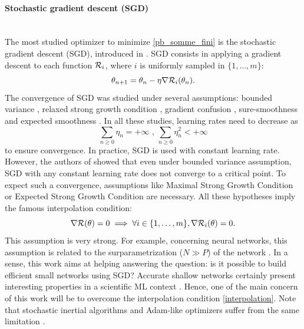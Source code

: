 \paragraph{Stochastic gradient descent (SGD)}
~~\\
The most studied optimizer to minimize \eqref{pb_somme_fini} is the stochastic gradient descent (SGD), introduced in \cite{SGD_Robins}. SGD consists in applying a gradient descent to each function $\mathcal{R}_i$, where $i$ is uniformly sampled in $\{1,\dots,m\}$:
\begin{equation}
	\theta_{n+1} = \theta_n-\eta \nabla \mathcal{R}_i(\theta_n).
	\label{SGD}
\end{equation}
The convergence of SGD was studied under several assumptions:
bounded variance \cite{sgd_general_diminishing_lr,Bertsekas_basis,sgd_dynamical_basis,bertsekas_theorem,SGD_upper_bound}, relaxed strong growth condition \cite{RG_mean,RG_almost_sure}, gradient confusion \cite{gradient_confusion}, sure-smoothness \cite{sure_smoothness_sgd} and expected smoothness \cite{ES_sgd,sgd_descent_condition,ES_sgd,sgd_global_KL}. In all these studies, learning rates need to decrease as
\begin{equation}
	\sum_{n\geq 0} \eta_n = +\infty \text{ , } \sum_{n\geq 0} \eta_n^{2}<+\infty
	\label{diminishing_step}
\end{equation}
to ensure convergence. In practice, SGD is used with constant learning rate. However, the authors of \cite{sgd_prec} showed that even under bounded variance assumption, SGD with any constant learning rate does not converge to a critical point. To expect such a convergence, assumptions like Maximal Strong Growth Condition \cite{MSG_strong_convex,MSG_IG} or Expected Strong Growth Condition \cite{ESG_upper_bound} are necessary. All these hypotheses imply the famous interpolation condition:
\begin{equation}
  \nabla \mathcal{R}(\theta)=0 \implies \forall i\in\{1,\dots,m\}, \nabla \mathcal{R}_i(\theta)=0.
	\label{interpolation}
\end{equation}
This assumption is very strong. For example, concerning neural networks, this assumption is related to the surparametrization ($N\gg P$) of the network \cite{ESG_upper_bound,ESG_IG}. 
In a sense, this work aims at helping answering the question: is it possible to build efficient small networks using SGD?
Accurate shallow networks certainly present interesting properties in a scientific ML context \cite{mettre_le_paquet_en_refs_ici,..,..,..,..,..,..}. 
Hence, one of the main concern of this work will be to overcome the interpolation condition \eqref{interpolation}. Note that stochastic inertial algorithms and Adam-like optimizers suffer from the same limitation \cite{sgd_prec,adam1,adam2,zou_rms,rms_not_bounded}.

